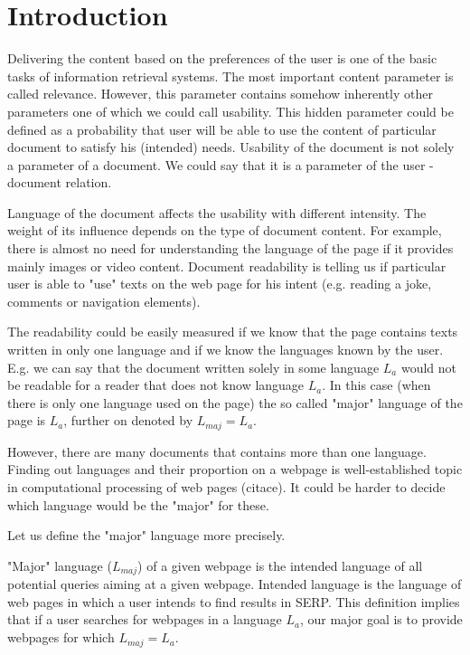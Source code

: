 \documentclass{acm_proc_article-sp}
\begin{document}
\section{Introduction}
  Delivering the content based on the preferences of the user is one of the basic tasks of information retrieval systems.
  The most important content parameter is called relevance. 
  However, this parameter contains somehow inherently other parameters one of which we could call usability.
  This hidden parameter could be defined as a probability that user will be able to use the content of particular 
  document to satisfy his (intended) needs.
  Usability of the document is not solely a parameter of a document. 
  We could say that it is a parameter of the user - document relation.

  Language of the document affects the usability with different intensity. 
  The weight of its influence depends on the type of document content.
  For example, there is almost no need for understanding the language of the page if it provides mainly images or video content.
  Document readability is telling us if particular user is able to
  "use" texts on the web page for his intent (e.g. reading a joke, comments or navigation elements).
  
  The readability could be easily measured if we know that the page contains texts written in only one language 
  and if we know the languages known by the user.
  E.g. we can say that the document written solely in some language $L_a$ would not be readable for a reader 
  that does not know language $L_a$. 
  In this case (when there is only one language used on the page) 
  the so called "major" language of the page is $L_a$, further on denoted by $L_{maj} = L_a$.
  
  However, there are many documents that contains more than one language.
  Finding out languages and their proportion on a webpage is well-established topic in computational processing of web pages (citace).
  It could be harder to decide which language would be the "major" for these.
 
  Let us define the "major" language more precisely. 
  
  "Major" language ($L_{maj}$) of a given webpage is the intended language of all potential queries aiming at a given webpage.
  Intended language is the language of web pages in which a user intends to find results in SERP. 
  This definition implies that if a user searches for webpages in a language $L_a$, 
  our major goal is to provide webpages for which $L_{maj} = L_a$.
  
\end{document}
